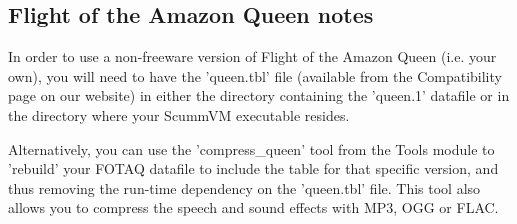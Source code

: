 \subsection{Flight of the Amazon Queen notes}
In order to use a non-freeware version of Flight of the Amazon Queen (i.e.
your own), you will need to have the 'queen.tbl' file (available from the
Compatibility page on our website) in either the directory containing the
'queen.1' datafile or in the directory where your ScummVM executable resides.
                  
Alternatively, you can use the 'compress_queen' tool from the Tools module to
'rebuild' your FOTAQ datafile to include the table for that specific version,
and thus removing the run-time dependency on the 'queen.tbl' file. 
This tool also allows you to compress the speech and sound effects with MP3,
OGG or FLAC.
